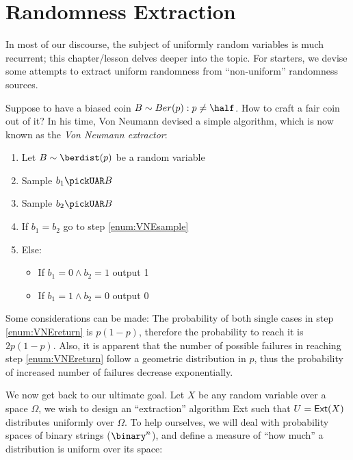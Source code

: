 
\newcommand{\ext}{\textup{\textsf{Ext}}}

\section{Randomness Extraction}

In most of our discourse, the subject of uniformly random variables is much recurrent; this chapter/lesson delves deeper into the topic. For starters, we devise some attempts to extract uniform randomness from ``non-uniform'' randomness sources.

Suppose to have a biased coin $B \sim Ber(p) : p \neq \half$. How to craft a fair coin out of it? In his time, Von Neumann devised a simple algorithm, which is now known as the \emph{Von Neumann extractor}:

\begin{enumerate}
    \item Let $B \sim \berdist(p)$ be a random variable
    \item \label{enum:VNEsample} Sample $b_1 \pickUAR B$
    \item Sample $b_2 \pickUAR B$
    \item If $b_1 = b_2$ go to step \ref{enum:VNEsample}
    \item \label{enum:VNEreturn} Else:
    \begin{itemize}
        \item If $b_1 = 0 \wedge b_2 = 1$ output 1
        \item If $b_1 = 1 \wedge b_2 = 0$ output 0 
    \end{itemize}
\end{enumerate}

Some considerations can be made: The probability of both single cases in step \ref{enum:VNEreturn} is $p(1 - p)$, therefore the probability to reach it is $2p(1 - p)$. Also, it is apparent that the number of possible failures in reaching step \ref{enum:VNEreturn} follow a geometric distribution in $p$, thus the probability of increased number of failures decrease exponentially.

We now get back to our ultimate goal. Let $X$ be any random variable over a space $\Omega$, we wish to design an ``extraction'' algorithm \ext{} such that $U = \ext(X)$ distributes uniformly over $\Omega$. To help ourselves, we will deal with probability spaces of binary strings ($\binary^n$), and define a measure of ``how much'' a distribution is uniform over its space:

